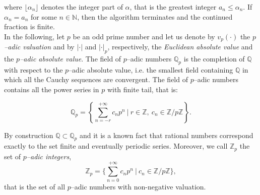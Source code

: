 \documentclass[12pt, reqno]{amsart}
\theoremstyle{plain}
\theoremstyle{definition}
\begin{document}
where $\lfloor \alpha_n \rfloor $ denotes the integer part of $\alpha$, that is the greatest integer $a_n\leq \alpha_n$. If $\alpha_n=a_n$ for some $n\in\mathbb{N}$, then the algorithm terminates and the continued fraction is finite.\\

In the following, let $p$ be an odd prime number and let us denote by $v_p(\cdot)$ the \textit{$p$--adic valuation} and by $|\cdot|$ and $|\cdot|_p$, respectively, the \textit{Euclidean absolute value} and the \textit{$p$--adic absolute value}. The field of $p$--adic numbers $\mathbb{Q}_p$ is the completion of $\mathbb{Q}$ with respect to the $p$--adic absolute value, i.e. the smallest field containing $\mathbb{Q}$ in which all the Cauchy sequences are convergent. The field of $p$--adic numbers contains all the power series in $p$ with finite tail, that is:

\begin{equation}\label{Eq: padicseries}
\mathbb{Q}_p=\left\{ \sum\limits_{n=-r}^{+\infty} c_np^n \ \Big| \ r\in\mathbb{Z}, \ c_n\in\mathbb{Z}/p\mathbb{Z} \right\}.
\end{equation}

By construction $\mathbb{Q}\subset\mathbb{Q}_p$ and it is a known fact that rational numbers correspond exactly to the set finite and eventually periodic series. Moreover, we call $\mathbb{Z}_p$ the set of \textit{$p$--adic integers},
\[\mathbb{Z}_{p}=\Bigg\{ \sum\limits_{n=0}^{+\infty} c_np^n \ \Big| \ c_n\in \mathbb{Z}/p\mathbb{Z} \Bigg\},\]
that is the set of all $p$--adic numbers with non-negative valuation.
\end{document}
